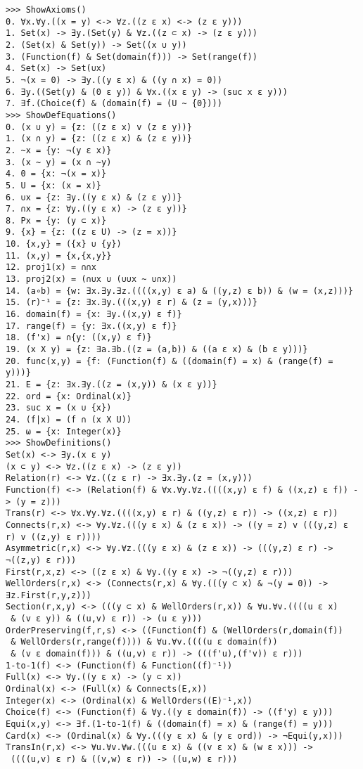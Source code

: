 \documentclass[12pt,leqno]{article}
\numberwithin{equation}{section}
\begin{document}
\begin{verbatim}
>>> ShowAxioms()
0. ∀x.∀y.((x = y) <-> ∀z.((z ε x) <-> (z ε y))) 
1. Set(x) -> ∃y.(Set(y) & ∀z.((z ⊂ x) -> (z ε y))) 
2. (Set(x) & Set(y)) -> Set((x ∪ y)) 
3. (Function(f) & Set(domain(f))) -> Set(range(f)) 
4. Set(x) -> Set(∪x) 
5. ¬(x = 0) -> ∃y.((y ε x) & ((y ∩ x) = 0)) 
6. ∃y.((Set(y) & (0 ε y)) & ∀x.((x ε y) -> (suc x ε y))) 
7. ∃f.(Choice(f) & (domain(f) = (U ~ {0}))) 
>>> ShowDefEquations()
0. (x ∪ y) = {z: ((z ε x) v (z ε y))} 
1. (x ∩ y) = {z: ((z ε x) & (z ε y))} 
2. ~x = {y: ¬(y ε x)} 
3. (x ~ y) = (x ∩ ~y) 
4. 0 = {x: ¬(x = x)} 
5. U = {x: (x = x)} 
6. ∪x = {z: ∃y.((y ε x) & (z ε y))} 
7. ∩x = {z: ∀y.((y ε x) -> (z ε y))} 
8. Px = {y: (y ⊂ x)} 
9. {x} = {z: ((z ε U) -> (z = x))} 
10. {x,y} = ({x} ∪ {y}) 
11. (x,y) = {x,{x,y}} 
12. proj1(x) = ∩∩x 
13. proj2(x) = (∩∪x ∪ (∪∪x ~ ∪∩x)) 
14. (a∘b) = {w: ∃x.∃y.∃z.((((x,y) ε a) & ((y,z) ε b)) & (w = (x,z)))} 
15. (r)⁻¹ = {z: ∃x.∃y.(((x,y) ε r) & (z = (y,x)))} 
16. domain(f) = {x: ∃y.((x,y) ε f)} 
17. range(f) = {y: ∃x.((x,y) ε f)} 
18. (f'x) = ∩{y: ((x,y) ε f)} 
19. (x X y) = {z: ∃a.∃b.((z = (a,b)) & ((a ε x) & (b ε y)))} 
20. func(x,y) = {f: (Function(f) & ((domain(f) = x) & (range(f) = y)))} 
21. E = {z: ∃x.∃y.((z = (x,y)) & (x ε y))} 
22. ord = {x: Ordinal(x)} 
23. suc x = (x ∪ {x}) 
24. (f|x) = (f ∩ (x X U)) 
25. ω = {x: Integer(x)} 
>>> ShowDefinitions()
Set(x) <-> ∃y.(x ε y)
(x ⊂ y) <-> ∀z.((z ε x) -> (z ε y))
Relation(r) <-> ∀z.((z ε r) -> ∃x.∃y.(z = (x,y)))
Function(f) <-> (Relation(f) & ∀x.∀y.∀z.((((x,y) ε f) & ((x,z) ε f)) -> (y = z)))
Trans(r) <-> ∀x.∀y.∀z.((((x,y) ε r) & ((y,z) ε r)) -> ((x,z) ε r))
Connects(r,x) <-> ∀y.∀z.(((y ε x) & (z ε x)) -> ((y = z) v (((y,z) ε r) v ((z,y) ε r))))
Asymmetric(r,x) <-> ∀y.∀z.(((y ε x) & (z ε x)) -> (((y,z) ε r) -> ¬((z,y) ε r)))
First(r,x,z) <-> ((z ε x) & ∀y.((y ε x) -> ¬((y,z) ε r)))
WellOrders(r,x) <-> (Connects(r,x) & ∀y.(((y ⊂ x) & ¬(y = 0)) -> ∃z.First(r,y,z)))
Section(r,x,y) <-> (((y ⊂ x) & WellOrders(r,x)) & ∀u.∀v.((((u ε x)
 & (v ε y)) & ((u,v) ε r)) -> (u ε y)))
OrderPreserving(f,r,s) <-> ((Function(f) & (WellOrders(r,domain(f))
 & WellOrders(r,range(f)))) & ∀u.∀v.((((u ε domain(f)) 
 & (v ε domain(f))) & ((u,v) ε r)) -> (((f'u),(f'v)) ε r)))
1-to-1(f) <-> (Function(f) & Function((f)⁻¹))
Full(x) <-> ∀y.((y ε x) -> (y ⊂ x))
Ordinal(x) <-> (Full(x) & Connects(E,x))
Integer(x) <-> (Ordinal(x) & WellOrders((E)⁻¹,x))
Choice(f) <-> (Function(f) & ∀y.((y ε domain(f)) -> ((f'y) ε y)))
Equi(x,y) <-> ∃f.(1-to-1(f) & ((domain(f) = x) & (range(f) = y)))
Card(x) <-> (Ordinal(x) & ∀y.(((y ε x) & (y ε ord)) -> ¬Equi(y,x)))
TransIn(r,x) <-> ∀u.∀v.∀w.(((u ε x) & ((v ε x) & (w ε x))) ->
 ((((u,v) ε r) & ((v,w) ε r)) -> ((u,w) ε r)))
\end{verbatim}
\end{document}
